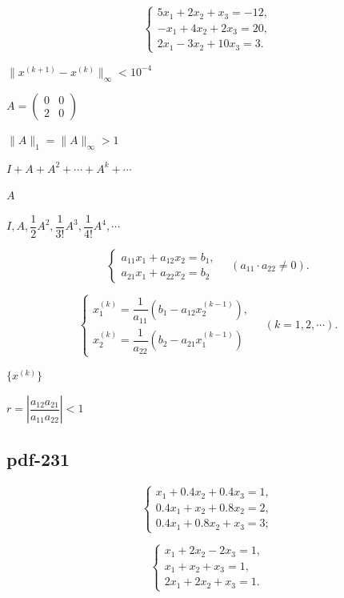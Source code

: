 \documentclass[UTF8,fontset=fandol]{ctexart}
\begin{document}
\[
\begin{cases}
5x_1+2x_2+x_3=-12,\\
-x_1+4x_2+2x_3=20,\\
2x_1-3x_2+10x_3=3.
\end{cases}
\]

$\|x^{(k+1)}-x^{(k)}\|_\infty<10^{-4}$\par

$A=\begin{pmatrix}0&0\\2&0\end{pmatrix}$\par

$\|A\|_1=\|A\|_\infty>1$\par

$I+A+A^2+\cdots+A^k+\cdots$\par

$A$\par

$I,A,\dfrac12A^2,\dfrac1{3!}A^3,\dfrac1{4!}A^4,\cdots$\par

\[
\begin{cases}
a_{11}x_1+a_{12}x_2=b_1,\\
a_{21}x_1+a_{22}x_2=b_2
\end{cases}
\quad(a_{11}\cdot a_{22}\neq0).
\]

\[
\begin{cases}
x_1^{(k)}=\dfrac1{a_{11}}(b_1-a_{12}x_2^{(k-1)}),\\[5pt]
x_2^{(k)}=\dfrac1{a_{22}}(b_2-a_{21}x_1^{(k-1)})
\end{cases}
\quad(k=1,2,\cdots).
\]

$\{x^{(k)}\}$\par

$r=\left|\dfrac{a_{12}a_{21}}{a_{11}a_{22}}\right|<1$\par

\subsection*{pdf-231}

\[
\begin{cases}
x_1+0.4x_2+0.4x_3=1,\\
0.4x_1+x_2+0.8x_2=2,\\
0.4x_1+0.8x_2+x_3=3;
\end{cases}
\]

\[
\begin{cases}
x_1+2x_2-2x_3=1,\\
x_1+x_2+x_3=1,\\
2x_1+2x_2+x_3=1.
\end{cases}
\]
\end{document}
